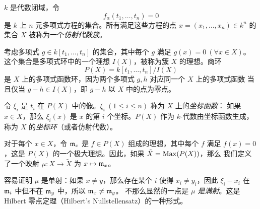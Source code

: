 \begin{problem}
  $k$ 是代数闭域，令
  \[
    f_\alpha(t_1,\dots,t_n)=0  
  \]
  是 $k$ 上 $n$ 元多项式方程的集合。所有满足这些方程的点 $x=(x_1,\dots,x_n)\in k^n$
  的集合 $X$ 被称为一个\emph{仿射代数簇}。

  考虑多项式 $g\in k[t_1,\dots,t_n]$ 的集合，其中每个 $g$ 满足 $g(x)=0\ (\forall x\in X)$。
  这个集合是多项式环中的一个理想 $I(X)$，被称为簇 $X$ 的理想。商环
  \[
    P(X)=k[t_1,\dots,t_n]/I(X)  
  \]
  是 $X$ 上的多项式函数环，因为两个多项式 $g,h$ 对应同一个 $X$ 上的多项式函数
  当且仅当 $g-h\in I(X)$，即 $g-h$ 以 $X$ 中的点为零点。

  令 $\xi_i$ 是 $t_i$ 在 $P(X)$ 中的像。$\xi_i\ (1\leq i\leq n)$ 称为 $X$ 上的\emph{坐标函数}：
  如果 $x\in X$，那么 $\xi_i(x)$ 是 $x$ 的第 $i$ 个坐标。$P(X)$ 作为 $k$-代数由坐标函数生成，
  称为 $X$ 的\emph{坐标环}（或者仿射代数）。

  对于每个 $x\in X$，令 $\mathfrak{m}_x$ 是 $f\in P(X)$ 组成的理想，其中每个 $f$
  满足 $f(x)=0$，这是 $P(X)$ 的一个极大理想。因此，如果 $\tilde{X}=\operatorname{Max}(P(X))$，那么
  我们定义了一个映射 $\mu:X\to\tilde{X}$ 为 $x\mapsto \mathfrak{m}_x$。

  容易证明 $\mu$ 是单射：如果 $x\neq y$，那么存在某个 $i$ 使得 $x_i\neq y_i$，因此
  $\xi_i-x_i$ 在 $\mathfrak{m}_i$ 中但不在 $\mathfrak{m}_y$ 中，所以 $\mathfrak{m}_x\neq\mathfrak{m}_y$。
  不那么显然的一点是 \emph{$\mu$ 是满射}。这是 Hilbert 零点定理（Hilbert's Nullstellensatz）的一种形式。
\end{problem}

